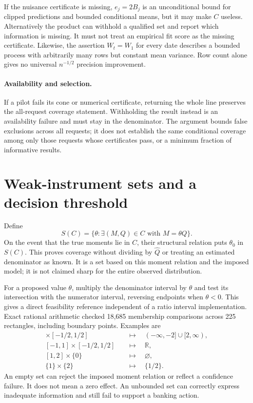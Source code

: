 If the nuisance certificate is missing, $e_j=2B_j$ is an unconditional bound
for clipped predictions and bounded conditional means, but it may make $C$
useless. Alternatively the product can withhold a qualified set and report
which information is missing. It must not treat an empirical fit score as the
missing certificate. Likewise, the assertion $W_t=W_1$ for every date describes
a bounded process with arbitrarily many rows but constant mean variance.
Row count alone gives no universal $n^{-1/2}$ precision improvement.

\paragraph{Availability and selection.}
If a pilot fails its cone or numerical certificate, returning the whole line
preserves the all-request coverage statement. Withholding the result instead
is an availability failure and must stay in the denominator. The argument
bounds false exclusions across all requests; it does not establish the same
conditional coverage among only those requests whose certificates pass, or a
minimum fraction of informative results.

\section{Weak-instrument sets and a decision threshold}

Define
\begin{equation}
 S(C)=\{\theta:\exists(M,Q)\in C\text{ with }M=\theta Q\}.
 \label{exec13:pilot-projection}
\end{equation}
On the event that the true moments lie in $C$, their structural relation puts
$\theta_0$ in $S(C)$. This proves coverage without dividing by $\widehat Q$
or treating an estimated denominator as known. It is a set based on this
moment relation and the imposed model; it is not claimed sharp for the entire
observed distribution.

For a proposed value $\theta$, multiply the denominator interval by $\theta$
and test its intersection with the numerator interval, reversing endpoints when
$\theta<0$. This gives a direct feasibility reference independent of a ratio
interval implementation. Exact rational arithmetic checked 18,685 membership
comparisons across 225 rectangles, including boundary points. Examples are
\begin{align*}
 [1,2]\mathbin\times[-1/2,1/2]&\quad\longmapsto\quad
 (-\infty,-2]\cup[2,\infty),\\
 [-1,1]\mathbin\times[-1/2,1/2]&\quad\longmapsto\quad\mathbb R,\\
 [1,2]\mathbin\times\{0\}&\quad\longmapsto\quad\varnothing,\\
 \{1\}\mathbin\times\{2\}&\quad\longmapsto\quad\{1/2\}.
\end{align*}
An empty set can reject the imposed moment relation or reflect a confidence
failure. It does not mean a zero effect. An unbounded set can correctly express
inadequate information and still fail to support a banking action.


